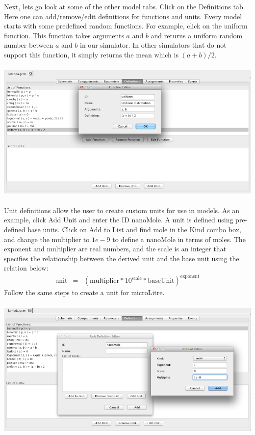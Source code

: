 \documentclass[titlepage,11pt]{article}
\begin{document}
Next, lets go look at some of the other model tabs.  Click on the Definitions tab.  Here one can add/remove/edit definitions for functions and units.  Every model starts with some predefined random functions.  For example, click on the uniform function.  This function takes arguments $a$ and $b$ and returns a uniform random number between $a$ and $b$ in our simulator.  In other simulators that do not support this function, it simply returns the mean which is $(a + b)/2$.

\begin{center}
\includegraphics[height=70mm]{screenshots/function}
\end{center}

Unit definitions allow the user to create custom units for use in models.  As an example, click Add Unit and enter the ID nanoMole.  A unit is defined using pre-defined base units.  Click on Add to List and find mole in the Kind combo box, and change the multiplier to $1e-9$ to define a nanoMole in terms of moles. The exponent and multiplier are real numbers, and the scale is an integer that specifies the relationship between the derived unit and the base unit using the relation below:
\begin{eqnarray*}
\mathrm{unit} & = & (\mathrm{multiplier} * 10^\mathrm{scale} * \mathrm{baseUnit})^\mathrm{exponent}
\end{eqnarray*}
Follow the same steps to create a unit for microLitre.

\begin{center}
\includegraphics[height=70mm]{screenshots/units}
\end{center}
\end{document}
